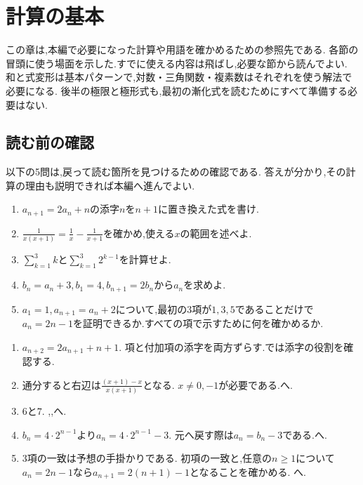 
\chapter{計算の基本}\label{章：計算の基本}
\begin{bookcolumns}
  この章は,本編で必要になった計算や用語を確かめるための参照先である.
  各節の冒頭に使う場面を示した.すでに使える内容は飛ばし,必要な節から読んでよい.
  和と式変形は基本パターンで,対数・三角関数・複素数はそれぞれを使う解法で必要になる.
  後半の極限と極形式も,最初の漸化式を読むためにすべて準備する必要はない.

  \section*{読む前の確認}\label{節：読む前の確認}
    以下の5問は,戻って読む箇所を見つけるための確認である.
    答えが分かり,その計算の理由も説明できれば本編へ進んでよい.

    \noindent{}
    \begin{enumerate}[format=\bookitemlink{reading-check}{problem}{answer}]
      \item $a_{n+1}=2a_n+n$の添字$n$を$n+1$に置き換えた式を書け.
      \item $\displaystyle\frac1{x(x+1)}=\frac1x-\frac1{x+1}$を確かめ,使える$x$の範囲を述べよ.
      \item $\displaystyle\sum_{k=1}^{3}k$と$\displaystyle\sum_{k=1}^{3}2^{k-1}$を計算せよ.
      \item $b_n=a_n+3$,\,$b_1=4$,\,$b_{n+1}=2b_n$から$a_n$を求めよ.
      \item $a_1=1$,\,$a_{n+1}=a_n+2$について,最初の3項が$1,3,5$であることだけで$a_n=2n-1$を証明できるか.すべての項で示すために何を確かめるか.
    \end{enumerate}

    \noindent{}
    \begin{enumerate}[format=\bookitemlink{reading-check}{answer}{problem}]
      \item $a_{n+2}=2a_{n+1}+n+1$.
            項と付加項の添字を両方ずらす.では添字の役割を確認する.
      \item 通分すると右辺は$\displaystyle\frac{(x+1)-x}{x(x+1)}$となる.
            $x\ne0,-1$が必要である.へ.
      \item $6$と$7$.
            ,,へ.
      \item $b_n=4\cdot2^{n-1}$より$a_n=4\cdot2^{n-1}-3$.
            元へ戻す際は$a_n=b_n-3$である.へ.
      \item 3項の一致は予想の手掛かりである.
            初項の一致と,任意の$n\ge1$について$a_n=2n-1$なら$a_{n+1}=2(n+1)-1$となることを確かめる.
            へ.
    \end{enumerate}


\end{bookcolumns}
